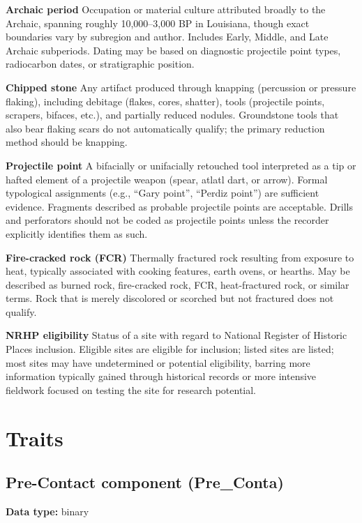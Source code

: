 \documentclass[
]{article}
\begin{document}
\textbf{Archaic period} Occupation or material culture attributed
broadly to the Archaic, spanning roughly 10,000--3,000 BP in Louisiana,
though exact boundaries vary by subregion and author. Includes Early,
Middle, and Late Archaic subperiods. Dating may be based on diagnostic
projectile point types, radiocarbon dates, or stratigraphic position.

\textbf{Chipped stone} Any artifact produced through knapping
(percussion or pressure flaking), including debitage (flakes, cores,
shatter), tools (projectile points, scrapers, bifaces, etc.), and
partially reduced nodules. Groundstone tools that also bear flaking
scars do not automatically qualify; the primary reduction method should
be knapping.

\textbf{Projectile point} A bifacially or unifacially retouched tool
interpreted as a tip or hafted element of a projectile weapon (spear,
atlatl dart, or arrow). Formal typological assignments (e.g., ``Gary
point'', ``Perdiz point'') are sufficient evidence. Fragments described
as probable projectile points are acceptable. Drills and perforators
should not be coded as projectile points unless the recorder explicitly
identifies them as such.

\textbf{Fire-cracked rock (FCR)} Thermally fractured rock resulting from
exposure to heat, typically associated with cooking features, earth
ovens, or hearths. May be described as burned rock, fire-cracked rock,
FCR, heat-fractured rock, or similar terms. Rock that is merely
discolored or scorched but not fractured does not qualify.

\textbf{NRHP eligibility} Status of a site with regard to National
Register of Historic Places inclusion. Eligible sites are eligible for
inclusion; listed sites are listed; most sites may have undetermined or
potential eligibility, barring more information typically gained through
historical records or more intensive fieldwork focused on testing the
site for research potential.

\section{Traits}\label{traits}

\subsection{Pre-Contact component
(Pre\_Conta)}\label{pre-contact-component-pre_conta}

\textbf{Data type:} binary
\end{document}
